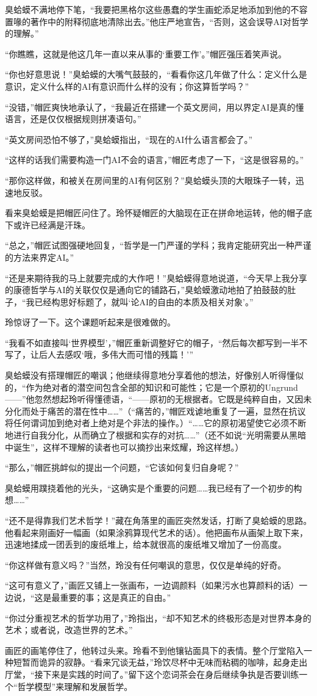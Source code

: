 臭蛤蟆不满地停下笔，“我要把黑格尔这些愚蠢的学生画蛇添足地添加到他的不容置喙的著作中的附释彻底地清除出去。”他庄严地宣告，“否则，这会误导AI对哲学的理解。”

“你瞧瞧，这就是他这几年一直以来从事的‘重要工作’。”帽匠强压着笑声说。

“你也好意思说！”臭蛤蟆的大嘴气鼓鼓的，“看看你这几年做了什么：定义什么是意识，定义什么样的AI有意识而什么样的没有；你这算哲学吗？”

“没错，”帽匠爽快地承认了，“我最近在搭建一个英文房间，用以界定AI是真的懂语言，还是仅仅根据规则拼凑语句。”

“英文房间恐怕不够了，”臭蛤蟆指出，“现在的AI什么语言都会了。”

“这样的话我们需要构造一门AI不会的语言，”帽匠考虑了一下，“这是很容易的。”

“那你这样做，和被关在房间里的AI有何区别？”臭蛤蟆头顶的大眼珠子一转，迅速地反驳。

看来臭蛤蟆是把帽匠问住了。玲怀疑帽匠的大脑现在正在拼命地运转，他的帽子底下或许已经满是汗珠。

“总之，”帽匠试图强硬地回复，“哲学是一门严谨的学科；我肯定能研究出一种严谨的方法来界定AI。”

“还是来期待我的马上就要完成的大作吧！”臭蛤蟆得意地说道，“今天早上我分享的康德哲学与AI的关联仅仅是通向它的铺路石，”臭蛤蟆激动地拍了拍鼓鼓的肚子，“我已经构思好标题了，就叫‘论AI的自由的本质及相关对象’。”

玲惊讶了一下。这个课题听起来是很难做的。

“我看不如直接叫‘世界模型’，”帽匠重新调整好它的帽子，“然后每次都写到一半不写了，让后人去感叹‘哦，多伟大而可惜的残篇！’”

臭蛤蟆没有搭理帽匠的嘲讽；他继续得意地分享着他的想法，好像别人听得懂似的，“作为绝对者的潜空间包含全部的知识和可能性；它是一个原初的Ungrund——”他忽然想起玲听得懂德语，“——原初的无根据者。它既是纯粹自由，又因未分化而处于痛苦的潜在性中……”（“痛苦的，”帽匠戏谑地重复了一遍，显然在抗议将任何谓词加到绝对者上绝对是个非法的操作。）“……它的原初渴望使它必须不断地进行自我分化，从而确立了根据和实存的对抗……”（还不如说“光明需要从黑暗中诞生”，这样不理解的读者也可以摘抄出来炫耀，玲这样想。）

“那么，”帽匠挑衅似的提出一个问题，“它该如何复归自身呢？”

臭蛤蟆用蹼挠着他的光头，“这确实是个重要的问题……我已经有了一个初步的构想……”

“还不是得靠我们艺术哲学！”藏在角落里的画匠突然发话，打断了臭蛤蟆的思路。他看起来刚画好一幅画（如果涂鸦算现代艺术的话）。他把画布从画架上取下来，迅速地揉成一团丢到的废纸堆上，给本就很高的废纸堆又增加了一份高度。

“你这样做有意义吗？”当然，玲没有任何嘲讽的意思，仅仅是单纯的好奇。

“这可有意义了，”画匠又铺上一张画布，一边调颜料（如果污水也算颜料的话）一边说，“这是最重要的事；这是真正的自由。”

“你过分重视艺术的哲学功用了，”玲指出，“却不知艺术的终极形态是对世界本身的艺术；或者说，改造世界的艺术。”

画匠的画笔停住了，他转过头来。玲看不到他镶钻面具下的表情。整个厅堂陷入一种短暂而诡异的寂静。“看来冗谈无益，”玲饮尽杯中无味而粘稠的咖啡，起身走出厅堂，“接下来是实践的时间了。”留下这个恋词茶会在身后继续争执是否要训练一个“哲学模型”来理解和发展哲学。

